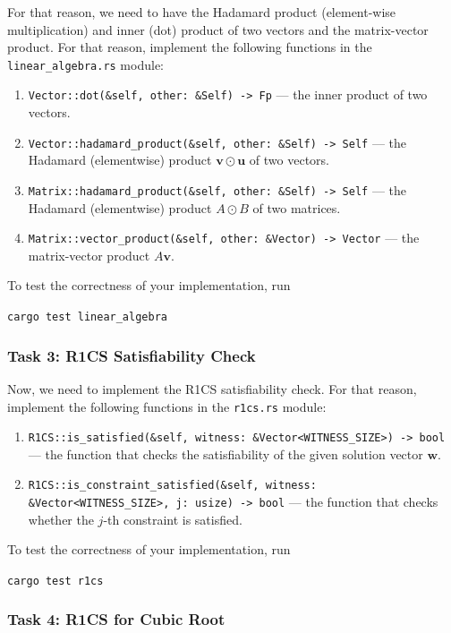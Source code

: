 \documentclass{zkdl-tests-template}
\begin{document}
For that reason, we need to have the Hadamard product (element-wise multiplication) and inner (dot) product of two vectors and the matrix-vector product. For that reason, implement the following functions in the \texttt{linear\_algebra.rs} module:
\begin{enumerate}
    \item \texttt{Vector::dot(\&self, other: \&Self) -> Fp} --- the inner product of two vectors.
    \item \texttt{Vector::hadamard\_product(\&self, other: \&Self) -> Self} --- the Hadamard (elementwise) product $\mathbf{v} \odot \mathbf{u}$ of two vectors.
    \item \texttt{Matrix::hadamard\_product(\&self, other: \&Self) -> Self} --- the Hadamard (elementwise) product $A \odot B$ of two matrices.
    \item \texttt{Matrix::vector\_product(\&self, other: \&Vector) -> Vector} --- the matrix-vector product $A\mathbf{v}$.
\end{enumerate}

To test the correctness of your implementation, run
\begin{center}
    \texttt{cargo test linear\_algebra}
\end{center}

\subsubsection{Task 3: R1CS Satisfiability Check}

Now, we need to implement the R1CS satisfiability check. For that reason, implement the following functions in the \texttt{r1cs.rs} module:
\begin{enumerate}
    \item \texttt{R1CS::is\_satisfied(\&self, witness: \&Vector<WITNESS\_SIZE>) -> bool} --- the function that checks the satisfiability of the given solution vector $\mathbf{w}$.
    \item \texttt{R1CS::is\_constraint\_satisfied(\&self, witness: \&Vector<WITNESS\_SIZE>, j: usize) -> bool} --- the function that checks whether the $j$-th constraint is satisfied.
\end{enumerate}

To test the correctness of your implementation, run
\begin{center}
    \texttt{cargo test r1cs}
\end{center}

\subsubsection{Task 4: R1CS for Cubic Root}
\end{document}
